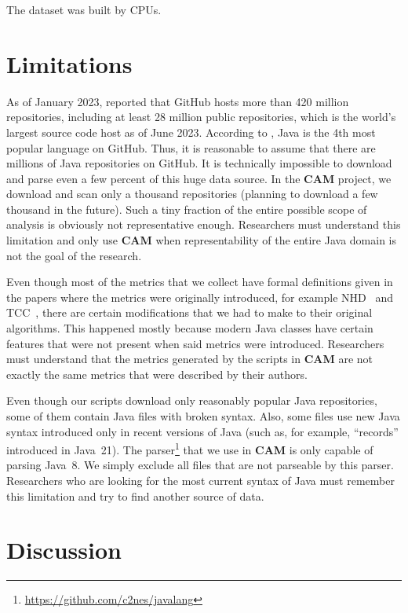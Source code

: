 \documentclass[sigplan,nonacm,review,anonymous]{acmart}
\newcommand\cam{{\sffamily\bfseries CAM}}
\begin{document}
The dataset was built by
\unskip{}
CPUs\unskip{}.


\section{Limitations}\label{sec:limitations}

As of January 2023, \citet{dohmke2023} reported that GitHub hosts more than
420 million repositories, including at least 28 million public repositories,
which is the world's largest source code host as of June 2023. According
to \citep{daigle2023}, Java is the 4th most popular language on GitHub. Thus,
it is reasonable to assume that there are millions of Java repositories on
GitHub. It is technically impossible to download and parse even a few percent
of this huge data source. In the \cam{} project, we download and scan only a
thousand repositories (planning to download a few thousand in the future).
Such a tiny fraction of the entire possible scope of analysis is obviously
not representative enough. Researchers must understand this limitation and
only use \cam{} when representability of the entire Java domain is not the
goal of the research.

Even though most of the metrics that we collect have formal definitions
given in the papers where the metrics were originally introduced,
for example NHD~\citep{counsell2006interpretation} and
TCC~\citep{bieman1995cohesion}, there are certain modifications
that we had to make to their original algorithms. This happened mostly
because modern Java classes have certain features that were not present
when said metrics were introduced. Researchers must understand that
the metrics generated by the scripts in \cam{} are not exactly the same
metrics that were described by their authors.

Even though our scripts download only reasonably popular Java repositories,
some of them contain Java files with broken syntax. Also, some files use
new Java syntax introduced only in recent versions of Java (such as,
for example, ``records'' introduced in Java~21).
The parser\footnote{\url{https://github.com/c2nes/javalang}} that we use
in \cam{} is only capable of parsing Java~8. We simply exclude all files
that are not parseable by this parser. Researchers who are looking for
the most current syntax of Java must remember this limitation and try
to find another source of data.

\section{Discussion}\label{sec:discussion}
\end{document}
